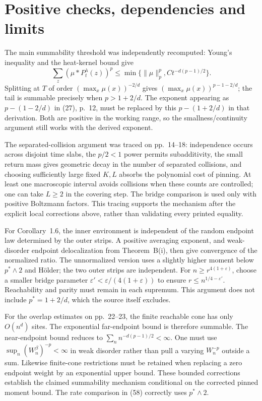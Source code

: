 \documentclass[10pt]{article}
\begin{document}
\section*{Positive checks, dependencies and limits}
The main summability threshold was independently recomputed: Young’s inequality and the heat-kernel bound give \[\sum_z(\mu*P_t^\lambda(z))^p
 \leq\min\{\|\mu\|_p^p,Ct^{-d(p-1)/2}\}.\] Splitting at \(T\) of order \((\max_x\mu(x))^{-2/d}\) gives \((\max_x\mu(x))^{p-1-2/d}\); the tail is summable precisely when \(p>1+2/d\). The exponent appearing as \(p-(1-2/d)\) in (27), p. 12, must be replaced by this \(p-(1+2/d)\) in that derivation. Both are positive in the working range, so the smallness/continuity argument still works with the derived exponent.\par
The separated-collision argument was traced on pp. 14–18: independence occurs across disjoint time slabs, the \(p/2<1\) power permits subadditivity, the small return mass gives geometric decay in the number of separated collisions, and choosing sufficiently large fixed \(K,L\) absorbs the polynomial cost of pinning. At least one macroscopic interval avoids collisions when these counts are controlled; one can take \(L\geq2\) in the covering step. The bridge comparison is used only with positive Boltzmann factors. This tracing supports the mechanism after the explicit local corrections above, rather than validating every printed equality.\par
For Corollary 1.6, the inner environment is independent of the random endpoint law determined by the outer strips. A positive averaging exponent, and weak-disorder endpoint delocalization from Theorem B(i), then give convergence of the normalized ratio. The unnormalized version uses a slightly higher moment below \(p^*\wedge2\) and Hölder; the two outer strips are independent. For \(n\geq r^{4(1+\varepsilon)}\), choose a smaller bridge parameter \(\varepsilon'<\varepsilon/(4(1+\varepsilon))\) to ensure \(r\leq n^{1/4-\varepsilon'}\). Reachability and parity must remain in each supremum. This argument does not include \(p^*=1+2/d\), which the source itself excludes.\par
For the overlap estimates on pp. 22–23, the finite reachable cone has only \(O(n^d)\) sites. The exponential far-endpoint bound is therefore summable. The near-endpoint bound reduces to \(\sum_n n^{-d(p-1)/2}<\infty\). One must use \(\sup_n(W_n^\beta)^{-p}<\infty\) in weak disorder rather than pull a varying \(W_n^{-p}\) outside a sum. Likewise finite-cone restrictions must be retained when replacing a zero endpoint weight by an exponential upper bound. These bounded corrections establish the claimed summability mechanism conditional on the corrected pinned moment bound. The rate comparison in (58) correctly uses \(p^*\wedge2\).\par
\end{document}
